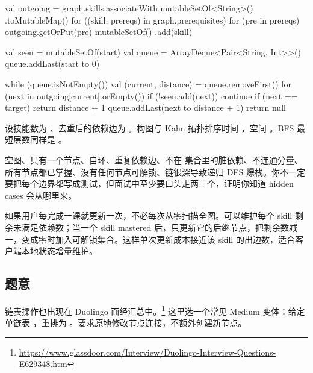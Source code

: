 \begin{kotlin}
{    val outgoing = graph.skills.associateWith { mutableSetOf<String>() }.toMutableMap()
    for ((skill, prereqs) in graph.prerequisites) {
        for (pre in prereqs) outgoing.getOrPut(pre) { mutableSetOf() }.add(skill)
    }

    val seen = mutableSetOf(start)
    val queue = ArrayDeque<Pair<String, Int>>()
    queue.addLast(start to 0)

    while (queue.isNotEmpty()) {
        val (current, distance) = queue.removeFirst()
        for (next in outgoing[current].orEmpty()) {
            if (!seen.add(next)) continue
            if (next == target) return distance + 1
            queue.addLast(next to distance + 1)
        }
    }
    return null
}
\end{kotlin}

\begin{keypoint}[复杂度]
设技能数为 、去重后的依赖边为 。构图与 Kahn 拓扑排序时间 ，空间 。BFS 最短层数同样是 。
\end{keypoint}

\begin{pitfall}[隐藏测试常打这些边界]
空图、只有一个节点、自环、重复依赖边、不在  集合里的脏依赖、不连通分量、所有节点都已掌握、没有任何节点可解锁、链很深导致递归 DFS 爆栈。你不一定要把每个边界都写成测试，但面试中至少要口头走两三个，证明你知道 hidden cases 会从哪里来。
\end{pitfall}

\begin{followup}
如果用户每完成一课就更新一次，不必每次从零扫描全图。可以维护每个 skill 剩余未满足依赖数；当一个 skill mastered 后，只更新它的后继节点，把剩余数减一，变成零时加入可解锁集合。这样单次更新成本接近该 skill 的出边数，适合客户端本地状态增量维护。
\end{followup}


\subsection*{题意}

链表操作也出现在 Duolingo 面经汇总中。\srccommunity\footnote{\url{https://www.glassdoor.com/Interview/Duolingo-Interview-Questions-E629348.htm}} 这里选一个常见 Medium 变体：给定单链表 ，重排为 。要求原地修改节点连接，不额外创建新节点。

